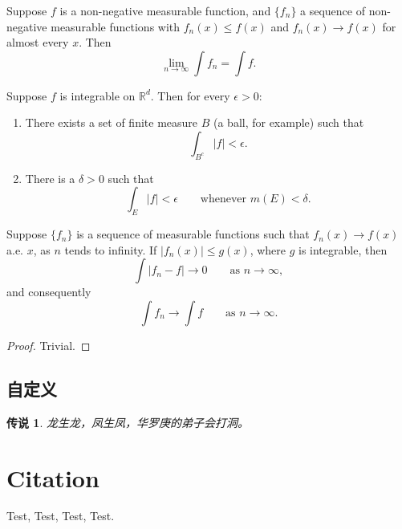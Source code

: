 \begin{corollary}
    Suppose $f$ is a non-negative measurable function, and $\{f_n\}$ a sequence
    of non-negative measurable functions with
    $f_n(x) \leq f(x)$ and $f_n(x) \to f(x)$ for almost every $x$. Then
    \begin{equation}
        \lim_{n \to \infty} \int f_n = \int f.
    \end{equation}
\end{corollary}

\begin{proposition}
    Suppose $f$ is integrable on $\mathbb{R}^d$. Then for every $\epsilon > 0$:
    \begin{enumerate}
        \renewcommand{\theenumi}{\roman{enumi}}
        \item There exists a set of finite measure $B$ (a ball, for example) such that
        \begin{equation}
            \int_{B^c} |f| < \epsilon.
        \end{equation}
        \item There is a $\delta > 0$ such that
        \begin{equation}
            \int_E |f|  < \epsilon \qquad \text{whenever } m(E) < \delta.
        \end{equation}
    \end{enumerate}
\end{proposition}

\begin{theorem}
    Suppose $\{f_n\}$ is a sequence of measurable functions such that
    $f_n(x) \to f(x)$ a.e. $x$, as $n$ tends to infinity.
    If $|f_n(x)| \leq g(x)$, where $g$ is integrable, then
    \begin{equation}
        \int |f_n - f| \to 0 \qquad \text{as } n \to \infty,
    \end{equation}
    and consequently
    \begin{equation}
        \int f_n \to \int f \qquad \text{as } n \to \infty.
    \end{equation}
\end{theorem}

\begin{proof}
    Trivial.
\end{proof}

\section{自定义}
\newtheorem{legend}{传说}
\begin{legend}
    龙生龙，凤生凤，华罗庚的弟子会打洞。
\end{legend}

\chapter{Citation}

Test\cite{mittelbach04},
Test\cite{lamport94},
Test\cite{knuth86a,lamport94,mittelbach04},
Test\cite{刘海洋2013}.
